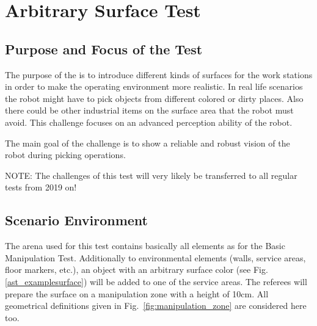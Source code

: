 
\newpage
\section{Arbitrary Surface Test}

\subsection{Purpose and Focus of the Test}
The purpose of the  is to introduce different kinds of surfaces for the work stations in order to make the operating environment more realistic. In real life scenarios the robot might have to pick objects from different colored or dirty places. Also there could be other industrial items on the surface area that the robot must avoid. This challenge focuses on an advanced perception ability of the robot. \par The main goal of the challenge is to show a reliable and robust vision of the robot during picking operations.

\par
NOTE: The challenges of this test will very likely be transferred to all regular tests from 2019 on!

\subsection{Scenario Environment}
The arena used for this test contains basically all elements as for the Basic Manipulation Test. Additionally to environmental elements (walls, service areas, floor markers, etc.), an object with an arbitrary surface color (see Fig. \ref{ast_examplesurface}) will be added to one of the service areas. The referees will prepare the surface on a manipulation zone with a height of 10cm. All geometrical definitions given in Fig.~\ref{fig:manipulation_zone} are considered here too.

